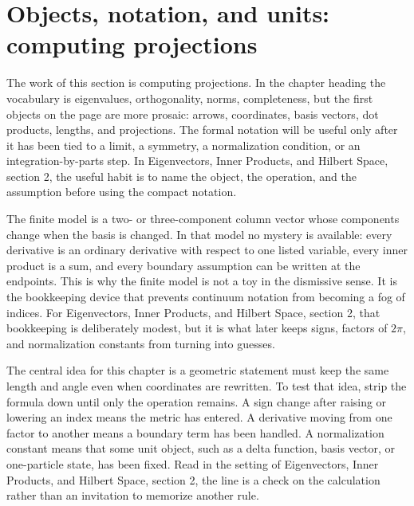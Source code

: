 \section{Objects, notation, and units: computing projections}













The work of this section is computing projections.  In the chapter heading the vocabulary is eigenvalues, orthogonality, norms, completeness, but the first objects on the page are more prosaic: arrows, coordinates, basis vectors, dot products, lengths, and projections.  The formal notation will be useful only after it has been tied to a limit, a symmetry, a normalization condition, or an integration-by-parts step.  In Eigenvectors, Inner Products, and Hilbert Space, section 2, the useful habit is to name the object, the operation, and the assumption before using the compact notation.

The finite model is a two- or three-component column vector whose components change when the basis is changed.  In that model no mystery is available: every derivative is an ordinary derivative with respect to one listed variable, every inner product is a sum, and every boundary assumption can be written at the endpoints.  This is why the finite model is not a toy in the dismissive sense.  It is the bookkeeping device that prevents continuum notation from becoming a fog of indices.  For Eigenvectors, Inner Products, and Hilbert Space, section 2, that bookkeeping is deliberately modest, but it is what later keeps signs, factors of \(2\pi\), and normalization constants from turning into guesses.

The central idea for this chapter is a geometric statement must keep the same length and angle even when coordinates are rewritten.  To test that idea, strip the formula down until only the operation remains.  A sign change after raising or lowering an index means the metric has entered.  A derivative moving from one factor to another means a boundary term has been handled.  A normalization constant means that some unit object, such as a delta function, basis vector, or one-particle state, has been fixed.  Read in the setting of Eigenvectors, Inner Products, and Hilbert Space, section 2, the line is a check on the calculation rather than an invitation to memorize another rule.

